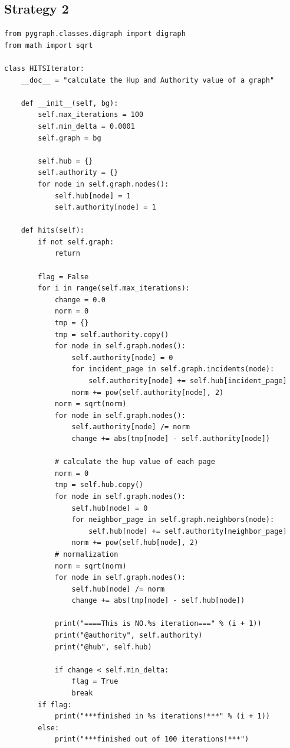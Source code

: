 \documentclass{article}
\begin{document}
\subsection{Strategy 2}
\begin{lstlisting}
from pygraph.classes.digraph import digraph
from math import sqrt

class HITSIterator:
    __doc__ = "calculate the Hup and Authority value of a graph"

    def __init__(self, bg):
        self.max_iterations = 100  
        self.min_delta = 0.0001  
        self.graph = bg

        self.hub = {}
        self.authority = {}
        for node in self.graph.nodes():
            self.hub[node] = 1
            self.authority[node] = 1

    def hits(self):
        if not self.graph:
            return

        flag = False
        for i in range(self.max_iterations):
            change = 0.0 
            norm = 0  
            tmp = {}
            tmp = self.authority.copy()
            for node in self.graph.nodes():
                self.authority[node] = 0
                for incident_page in self.graph.incidents(node):  
                    self.authority[node] += self.hub[incident_page]
                norm += pow(self.authority[node], 2)
            norm = sqrt(norm)
            for node in self.graph.nodes():
                self.authority[node] /= norm
                change += abs(tmp[node] - self.authority[node])

            # calculate the hup value of each page
            norm = 0
            tmp = self.hub.copy()
            for node in self.graph.nodes():
                self.hub[node] = 0
                for neighbor_page in self.graph.neighbors(node):  
                    self.hub[node] += self.authority[neighbor_page]
                norm += pow(self.hub[node], 2)
            # normalization 
            norm = sqrt(norm)
            for node in self.graph.nodes():
                self.hub[node] /= norm
                change += abs(tmp[node] - self.hub[node])

            print("====This is NO.%s iteration===" % (i + 1))
            print("@authority", self.authority)
            print("@hub", self.hub)

            if change < self.min_delta:
                flag = True
                break
        if flag:
            print("***finished in %s iterations!***" % (i + 1))
        else:
            print("***finished out of 100 iterations!***")


\end{lstlisting}
\end{document}
